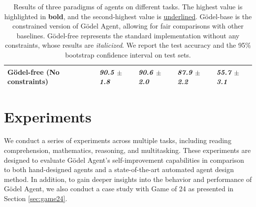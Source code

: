 \documentclass[11pt]{article}
\newcommand{\godel}{G\"odel\xspace}
\newcommand{\framework}{Gödel Agent\xspace}
\begin{document}
\begin{table}[t!]
\begin{tabular}{>{\raggedright\arraybackslash}p{5.2cm} >{\centering\arraybackslash}p{1.7cm} >{\centering\arraybackslash}p{1.7cm} >{\centering\arraybackslash}p{1.7cm} >{\centering\arraybackslash}p{1.7cm}}
        \godel-free (No constraints) & \textit{90.5 $\pm$ 1.8} & \textit{90.6 $\pm$ 2.0} & \textit{87.9 $\pm$ 2.2} & \textit{55.7 $\pm$ 3.1} 
        \\
        \bottomrule
    \end{tabular}
\caption{Results of three paradigms of agents on different tasks. The highest value is highlighted in \textbf{bold}, and the second-highest value is \underline{underlined}. \godel-base is the constrained version of \framework, allowing for fair comparisons with other baselines. \godel-free represents the standard implementation without any constraints, whose results are \textit{italicized}. We report the test accuracy and the 95\% bootstrap confidence interval on test sets\protect\footnotemark.}
    \label{tab:main}
\end{table}




\section{Experiments}

We conduct a series of experiments across multiple tasks, including reading comprehension, mathematics, reasoning, and multitasking. These experiments are designed to evaluate \framework{}’s self-improvement capabilities in comparison to both hand-designed agents and a state-of-the-art automated agent design method.
In addition, to gain deeper insights into the behavior and performance of \framework, we also conduct a case study with Game of 24 as presented in Section \ref{sec:game24}.

\end{document}
